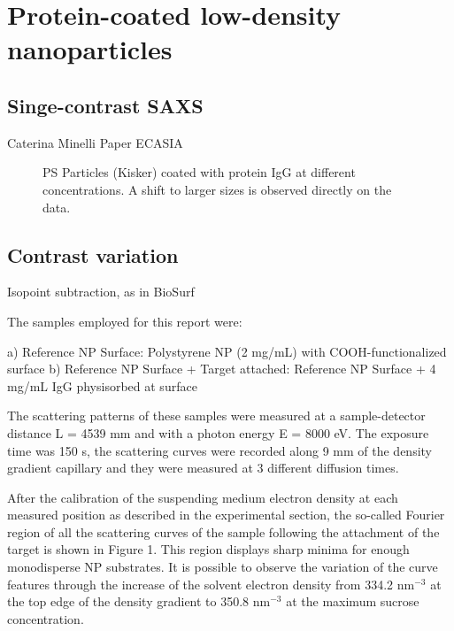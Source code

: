 \section{Protein-coated low-density nanoparticles}
\subsection{Singe-contrast SAXS}
Caterina Minelli Paper ECASIA
\begin{figure}
	\centering
		\caption{PS Particles (Kisker) coated with protein IgG at different concentrations. A shift to larger sizes is observed directly on the data.}
\end{figure}

\subsection{Contrast variation}
Isopoint subtraction, as in BioSurf

The samples employed for this report were:

a) Reference NP Surface: Polystyrene NP (2 mg/mL) with COOH-functionalized surface
b) Reference NP Surface + Target attached: Reference NP Surface + 4 mg/mL IgG physisorbed at surface

The scattering patterns of these samples were measured at a sample-detector distance L = 4539 mm and with a photon energy E = 8000 eV. The exposure time was 150 s, the scattering curves were recorded along 9 mm of the density gradient capillary and they were measured at 3 different diffusion times.

After the calibration of the suspending medium electron density at each measured position as described in the experimental section, the so-called Fourier region of all the scattering curves of the sample following the attachment of the target is shown in Figure 1. This region displays sharp minima for enough monodisperse NP substrates. It is possible to observe the variation of the curve features through the increase of the solvent electron density from 334.2 nm$^{-3}$ at the top edge of the density gradient to 350.8 nm$^{-3}$ at the maximum sucrose concentration.

